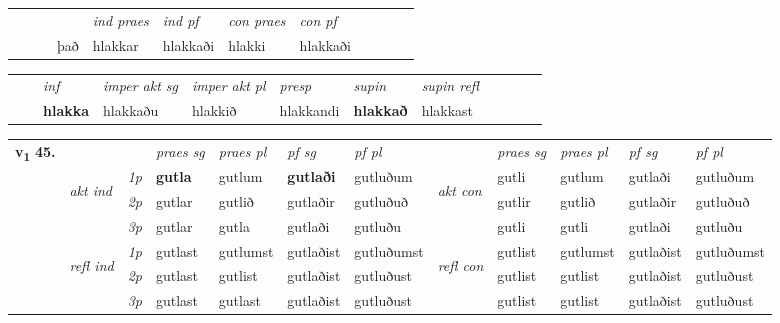 \begin{tabular}{llllllllllll}
 & &  & &  \textit{ind praes} & \textit{ind pf} & \textit{con praes} & \textit{con pf} \\*
&  & & það & hlakkar & hlakkaði & hlakki & hlakkaði \\*
\cmidrule{5-9}
\end{tabular}


\begin{tabular}{llllllllllll}
 & & \textit{inf} & \textit{imper akt sg} & \textit{imper akt pl}   & \textit{presp} & \textit{supin} & \textit{supin refl}      \\*
  & & \textbf{hlakka} & hlakkaðu  & hlakkið   & hlakkandi &  \textbf{hlakkað} & hlakkast  \\*
\cmidrule{1-12}
\end{tabular}



\begin{tabular}{llllllllllll} \toprule
\multirow{4}{*}{{{\textbf{v{\textsubscript{1}}} \Large{\textbf{45.}}}}}  & &   &  \textit{praes sg}  & \textit{praes pl}  &\textit{ pf sg} & \textit{pf pl} &  &  \textit{praes sg}  & \textit{praes pl}  & \textit{pf sg} & \textit{pf pl } \\*
	\cmidrule{4-7} \cmidrule{9-12}
 & \multirow{3}{*}{\begin{turn}{90}\textit{akt ind}\end{turn}} & {\textit{1p}} & \textbf{gutla} & gutlum    & \textbf{gutlaði} & gutluðum & \multirow{3}{*}{\begin{turn}{90}\textit{akt con}\end{turn}} &gutli & gutlum & gutlaði & gutluðum\\*
& &  {\textit{2p}} &  gutlar  & gutlið   & gutlaðir & gutluðuð & & gutlir & gutlið & gutlaðir & gutluðuð \\*
& &  {\textit{3p}} & gutlar & gutla   & gutlaði & gutluðu & & gutli & gutli& gutlaði & gutluðu  \\*
\cmidrule{4-7} \cmidrule{9-12}
 &\multirow{3}{*}{\begin{turn}{90}\textit{refl ind}\end{turn}} & {\textit{1p}} & gutlast & gutlumst    & gutlaðist & gutluðumst & \multirow{3}{*}{\begin{turn}{90}\textit{refl con}\end{turn}}  &gutlist & gutlumst & gutlaðist & gutluðumst\\*
 &&  {\textit{2p}} &  gutlast  & gutlist   & gutlaðist & gutluðust & &gutlist & gutlist & gutlaðist & gutluðust \\*
& &  {\textit{3p}} & gutlast & gutlast   & gutlaðist & gutluðust & & gutlist & gutlist& gutlaðist & gutluðust  \\*
\cmidrule{4-7} \cmidrule{9-12}
\end{tabular}


